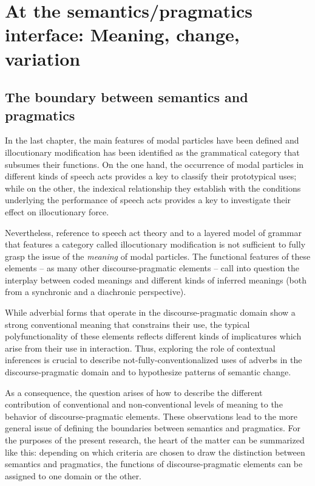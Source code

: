 \chapter{At the semantics/pragmatics interface: Meaning, change, variation}\label{sec:4}
\hypertarget{Toc124860626}{}\section{The boundary between semantics and pragmatics}
\hypertarget{Toc124860627}{}
In the last chapter, the main features of modal particles have been defined and illocutionary modification has been identified as the grammatical category that subsumes their functions. On the one hand, the occurrence of modal particles in different kinds of speech acts provides a key to classify their prototypical uses; while on the other, the indexical relationship they establish with the conditions underlying the performance of speech acts provides a key to investigate their effect on illocutionary force.

Nevertheless, reference to speech act theory and to a layered model of grammar that features a category called illocutionary modification is not sufficient to fully grasp the issue of the \textit{meaning} of modal particles. The functional features of these elements – as many other discourse-pragmatic elements – call into question the interplay between coded meanings and different kinds of inferred meanings (both from a synchronic and a diachronic perspective).

While adverbial forms that operate in the discourse-pragmatic domain show a strong conventional meaning that constrains their use, the typical polyfunctionality of these elements reflects different kinds of implicatures which arise from their use in interaction. Thus, exploring the role of contextual inferences is crucial to describe not-fully-conventionalized uses of adverbs in the discourse-pragmatic domain and to hypothesize patterns of semantic change.

As a consequence, the question arises of how to describe the different contribution of conventional and non-conventional levels of meaning to the behavior of discourse-pragmatic elements. These observations lead to the more general issue of defining the boundaries between semantics and pragmatics. For the purposes of the present research, the heart of the matter can be summarized like this: depending on which criteria are chosen to draw the distinction between semantics and pragmatics, the functions of discourse-pragmatic elements can be assigned to one domain or the other.

